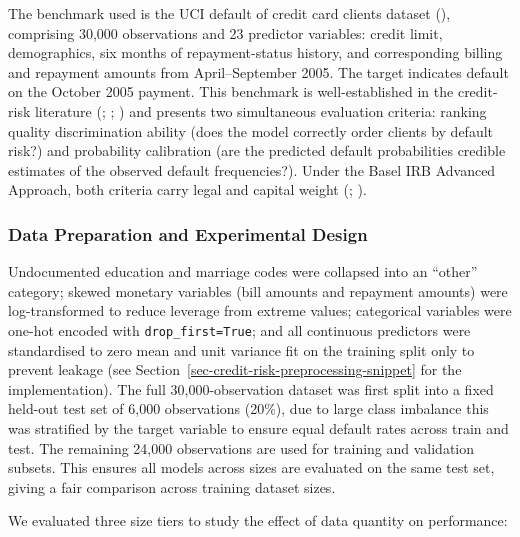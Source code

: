 \documentclass[
  letterpaper,
  DIV=11,
  numbers=noendperiod]{scrartcl}
\begin{document}
The benchmark used is the UCI default of credit card clients dataset
(), comprising
30,000 observations and 23 predictor variables: credit limit,
demographics, six months of repayment-status history, and corresponding
billing and repayment amounts from April--September 2005. The target
indicates default on the October 2005 payment. This benchmark is
well-established in the credit-risk literature
(;
;
) and presents
two simultaneous evaluation criteria: ranking quality discrimination
ability (does the model correctly order clients by default risk?) and
probability calibration (are the predicted default probabilities
credible estimates of the observed default frequencies?). Under the
Basel IRB Advanced Approach, both criteria carry legal and capital
weight (; ).

\subsubsection{Data Preparation and Experimental
Design}\label{data-preparation-and-experimental-design}

Undocumented education and marriage codes were collapsed into an
``other'' category; skewed monetary variables (bill amounts and
repayment amounts) were log-transformed to reduce leverage from extreme
values; categorical variables were one-hot encoded with
\texttt{drop\_first=True}; and all continuous predictors were
standardised to zero mean and unit variance fit on the training split
only to prevent leakage (see
Section~\ref{sec-credit-risk-preprocessing-snippet} for the
implementation). The full 30,000-observation dataset was first split
into a fixed held-out test set of 6,000 observations (20\%), due to
large class imbalance this was stratified by the target variable to
ensure equal default rates across train and test. The remaining 24,000
observations are used for training and validation subsets. This ensures
all models across sizes are evaluated on the same test set, giving a
fair comparison across training dataset sizes.

We evaluated three size tiers to study the effect of data quantity on
performance:
\end{document}

